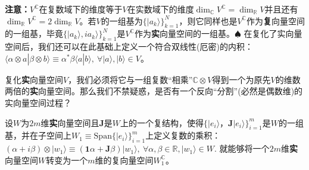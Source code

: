 \documentclass[mathserif,hyperref,UTF8,openany,b5paper]{ctexbook}
\begin{document}
\textbf{注意：}$V^{\mathbb{C}}$在复数域下的维度等于$V$在实数域下的维度$\dim_{\mathbb{C}}V^{\mathbb{C}}=\dim_{\mathbb{R}}V$并且还有$\dim_{\mathbb{R}}V^{\mathbb{C}}=2\dim_{\mathbb{R}}V$。若$V$的一组基为$\{|a_k\rangle\}^N_{k=1}$，则它同样也是$V^\mathbb{C}$作为\textbf{复}向量空间的一组基，毕竟$\{|a_k\rangle,i a_k\rangle\}^N_{k=1}$是$V^\mathbb{C}$作为\textbf{实}向量空间的一组基。$\spadesuit$ 在复化了实向量空间后，我们还可以在此基础上定义一个符合双线性(厄密)的内积：$\langle \alpha \otimes a|\beta\otimes b\rangle \equiv \alpha^*\beta\langle a|b\rangle,\ \forall|a\rangle,|b\rangle\in V$。

复化\textbf{实}向量空间$V$，我们必须将它与一组复数“相乘”$\mathbb{C}\otimes V$得到一个为原先$V$的维数两倍的\textbf{实}向量空间。那么我们不禁疑惑，是否有一个反向“分割”(必然是偶数维)的实向量空间过程？

设$W$为$2m$维\textbf{实}向量空间且$\mathbf{J}$是$W$上的一个复结构，使得$\{|e_i\rangle，\mathbf{J}|e_i\rangle\}^m_{i=1}$是$W$的一组基，并在子空间上$W_1\equiv\mbox{Span}\{|e_i\rangle\}^m_{i=1}$上定义复数的乘积：$ (\alpha+i\beta)\otimes|w_1\rangle\equiv(\mathbf{1}\alpha+\mathbf{J}\beta)|w_1\rangle,\ \forall \alpha,\beta\in\mathbb{R},|w_1\rangle\in W.$
就能够将一个$2m$维\textbf{实}向量空间$W$转变为一个$m$维的复向量空间$W_1^{\mathbb{C}}$。
\end{document}
